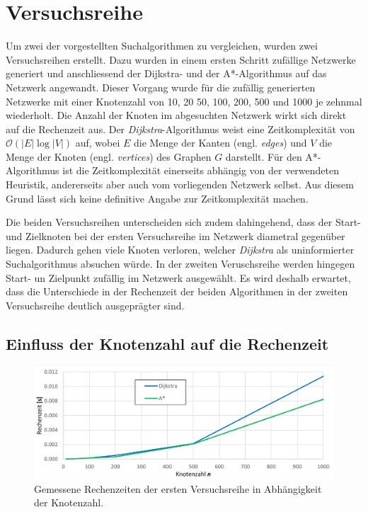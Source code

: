 \section{Versuchsreihe}
\label{section:verkehr/versuchsreihe}

Um zwei der vorgestellten Suchalgorithmen zu vergleichen, wurden zwei Versuchsreihen erstellt. Dazu wurden in einem ersten Schritt zufällige Netzwerke generiert und anschliessend der Dijkstra- und der A*-Algorithmus auf das Netzwerk angewandt.
Dieser Vorgang wurde für die zufällig generierten Netzwerke mit einer Knotenzahl von 10, 20 50, 100, 200, 500 und 1000 je zehnmal wiederholt.
Die Anzahl der Knoten im abgesuchten Netzwerk wirkt sich direkt auf die Rechenzeit aus. Der \emph{Dijkstra}-Algorithmus weist eine Zeitkomplexität von $\mathcal{O}(|E|\log{}|V|)$ auf, wobei $E$ die Menge der Kanten (engl. \emph{edges}) und $V$ die Menge der Knoten (engl. \emph{vertices}) des Graphen $G$ darstellt.
%
Für den A*-Algorithmus ist die Zeitkomplexität einerseits abhängig von der verwendeten Heuristik, andererseits aber auch vom vorliegenden Netzwerk selbst. Aus diesem Grund lässt sich keine definitive Angabe zur Zeitkomplexität machen.

Die beiden Versuchsreihen unterscheiden sich zudem dahingehend, dass der Start- und Zielknoten bei der ersten Versuchsreihe im Netzwerk diametral gegenüber liegen. Dadurch gehen viele Knoten verloren, welcher \emph{Dijkstra} als uninformierter Suchalgorithmus absuchen würde. In der zweiten Veruschsreihe werden hingegen Start- un Zielpunkt zufällig im Netzwerk ausgewählt. Es wird deshalb erwartet, dass die Unterschiede in der Rechenzeit der beiden Algorithmen in der zweiten Versuchsreihe deutlich ausgeprägter sind.

\subsection{Einfluss der Knotenzahl auf die Rechenzeit}
\label{verkehr:Knotenzahl}

\begin{figure}
\centering
\includegraphics[width=12cm]{papers/verkehr/figures/chart_Vr1.png}

\caption{Gemessene Rechenzeiten der ersten Versuchsreihe in Abhängigkeit der Knotenzahl.}
\label{verkehr:Vr1}
\end{figure}

